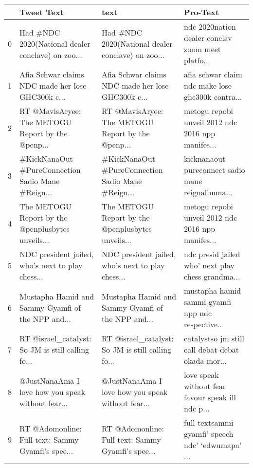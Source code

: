 \begin{tabular}{llll}
\toprule
{} &                                         Tweet Text &                                               text &                                           Pro-Text \\
\midrule
0 &  Had \#NDC 2020(National dealer conclave) on zoo... &  Had \#NDC 2020(National dealer conclave) on zoo... &  ndc 2020nation dealer conclav zoom meet platfo... \\
1 &  Afia Schwar claims NDC made her lose GHC300k c... &  Afia Schwar claims NDC made her lose GHC300k c... &  afia schwar claim ndc make lose ghc300k contra... \\
2 &  RT @MavisAryee: The METOGU Report by the @penp... &  RT @MavisAryee: The METOGU Report by the @penp... &  metogu repobi unveil 2012 ndc 2016 npp manifes... \\
3 &  \#KickNanaOut \#PureConnection Sadio Mane \#Reign... &  \#KickNanaOut \#PureConnection Sadio Mane \#Reign... &  kicknanaout pureconnect sadio mane reignalbuma... \\
4 &  The METOGU Report by the @penplusbytes unveils... &  The METOGU Report by the @penplusbytes unveils... &  metogu repobi unveil 2012 ndc 2016 npp manifes... \\
5 &  NDC president jailed, who’s next to play chess... &  NDC president jailed, who’s next to play chess... &  ndc presid jailed who’ next play chess grandma... \\
6 &  Mustapha Hamid and Sammy Gyamfi of the NPP and... &  Mustapha Hamid and Sammy Gyamfi of the NPP and... &  mustapha hamid sammi gyamfi npp ndc respective... \\
7 &  RT @israel\_catalyst: So JM is still calling fo... &  RT @israel\_catalyst: So JM is still calling fo... &  catalystso jm still call debat debat okada mor... \\
8 &  @JustNanaAma I love how you speak without fear... &  @JustNanaAma I love how you speak without fear... &  love speak without fear favour speak ill ndc p... \\
9 &  RT @Adomonline: Full text: Sammy Gyamfi’s spee... &  RT @Adomonline: Full text: Sammy Gyamfi’s spee... &  full textsammi gyamfi’ speech ndc’ ‘edwumapa’ ... \\
\bottomrule
\end{tabular}
